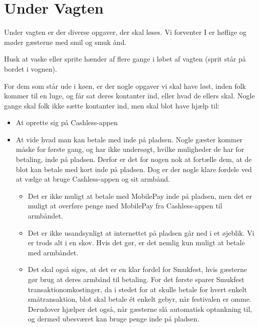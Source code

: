 \section{Under Vagten}
\label{sec:intra-barvagten}

Under vagten er der diverse opgaver, der skal løses. 
Vi forventer I er høflige og møder gæsterne med smil og smuk ånd.

Husk at vaske eller sprite hænder af flere gange 
i løbet af vagten (sprit står på bordet i vognen).

For dem som står ude i køen, er der nogle opgaver vi skal have løst, inden folk kommer til 
en luge, og får sat deres kontanter ind, eller hvad de ellers skal.
Nogle gange skal folk ikke sætte kontanter ind, men skal blot have hjælp til:
\begin{itemize}
  \item At oprette sig på Cashless-appen
  \item At vide hvad man kan betale med inde på pladsen. Nogle gæster kommer måske for første gang, 
  og har ikke undersøgt, hvilke muligheder de har for betaling, inde på pladsen.
  Derfor er det for nogen nok at fortælle dem, at de blot kan betale med kort inde på pladsen.
  Dog er der nogle klare fordele ved at vælge at bruge Cashless-appen og sit armbånd.
  \begin{itemize}
    \item Det er ikke muligt at betale med MobilePay inde på pladsen, men det er muligt at 
    overføre penge med MobilePay fra Cashless-appen til armbåndet.
    \item Det er ikke usandsynligt at internettet på pladsen går ned i et øjeblik. Vi er 
    trods alt i en skov. Hvis det gør, er det nemlig kun muligt at betale med armbåndet.
    \item Det skal også siges, at det er en klar fordel for Smukfest, hvis gæsterne gør brug at 
    deres armbånd til betaling. For det første sparer Smukfest transaktionomkostinger, da i stedet for 
    at skulle betale for hvert enkelt småtransaktion, blot skal betale ét enkelt gebyr, når festivalen er omme. 
    Derudover hjælper det også, når gæsterne slå automatisk optankning til, og dermed ubesværet
    kan bruge penge inde på pladsen.
  \end{itemize}
\end{itemize}

